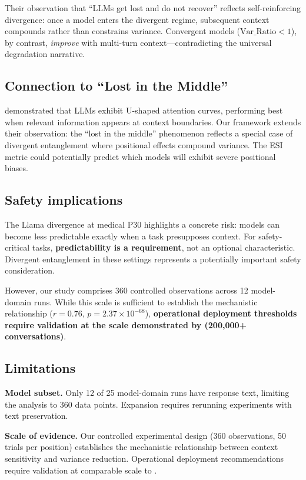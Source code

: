 \documentclass[11pt]{article}
\begin{document}
Their observation that ``LLMs get lost and do not recover'' reflects self-reinforcing divergence: once a model enters the divergent regime, subsequent context compounds rather than constrains variance. Convergent models ($\text{Var\_Ratio} < 1$), by contrast, \emph{improve} with multi-turn context---contradicting the universal degradation narrative.

\subsection{Connection to ``Lost in the Middle''}

\citet{liu2024lost} demonstrated that LLMs exhibit U-shaped attention curves, performing best when relevant information appears at context boundaries. Our framework extends their observation: the ``lost in the middle'' phenomenon reflects a special case of divergent entanglement where positional effects compound variance. The ESI metric could potentially predict which models will exhibit severe positional biases.

\subsection{Safety implications}

The Llama divergence at medical P30 highlights a concrete risk: models can become less predictable exactly when a task presupposes context. For safety-critical tasks, \textbf{predictability is a requirement}, not an optional characteristic. Divergent entanglement in these settings represents a potentially important safety consideration.

However, our study comprises 360 controlled observations across 12 model-domain runs. While this scale is sufficient to establish the mechanistic relationship ($r = 0.76$, $p = 2.37 \times 10^{-68}$), \textbf{operational deployment thresholds require validation at the scale demonstrated by \citet{laban2025lost} (200,000+ conversations)}.

\subsection{Limitations}

\textbf{Model subset.} Only 12 of 25 model-domain runs have response text, limiting the analysis to 360 data points. Expansion requires rerunning experiments with text preservation.

\textbf{Scale of evidence.} Our controlled experimental design (360 observations, 50 trials per position) establishes the mechanistic relationship between context sensitivity and variance reduction. Operational deployment recommendations require validation at comparable scale to \citet{laban2025lost}.
\end{document}
